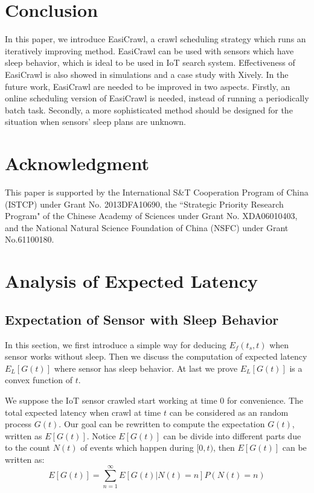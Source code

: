 \documentclass[conference]{IEEEtran}
\begin{document}
\section{Conclusion} \label{conclusion}

In this paper, we introduce EasiCrawl, a crawl scheduling strategy which runs an iteratively improving method. 
EasiCrawl can be used with sensors which have sleep behavior, which is ideal to be used in IoT search system. 
Effectiveness of EasiCrawl is also showed in simulations and a case study with Xively. 
In the future work, EasiCrawl are needed to be improved in two aspects.
Firstly, an online scheduling version of EasiCrawl is needed, instead of running a periodically batch task.
Secondly, a more sophisticated method should be designed for the situation when sensors' sleep plans are unknown. 

\section*{Acknowledgment}

This paper is supported by the International S\&T Cooperation Program of China (ISTCP) under Grant No. 2013DFA10690, the ``Strategic Priority Research Program" of the Chinese Academy of Sciences under Grant No. XDA06010403, and the National Natural Science Foundation of China (NSFC) under Grant No.61100180.

\ifCLASSOPTIONcaptionsoff
  \newpage
\fi





\appendices
\section{Analysis of Expected Latency}

\subsection{Expectation of Sensor with Sleep Behavior}

In this section, we first introduce a simple way for deducing $E_f(t_s, t)$ when sensor works without sleep.
Then we discuss the computation of expected latency $E_L[G(t)]$ where sensor has sleep behavior.
At last we prove $E_L[G(t)]$ is a convex function of $t$.

We suppose the IoT sensor crawled start working at time $0$ for convenience. 
The total expected latency when crawl at time $t$ can be considered as an random process $G(t)$. Our goal can be rewritten to compute the expectation $G(t)$, written as $E[G(t)]$. 
Notice $E[G(t)]$ can be divide into different parts due to the count $N(t)$ of events which happen during $[0, t)$, then $E[G(t)]$ can be written as:
\begin{equation}
E[G(t)] = \sum_{n=1}^{\infty} E[G(t)|N(t)=n]P(N(t)=n) \label{EG}
\end{equation}
\end{document}
